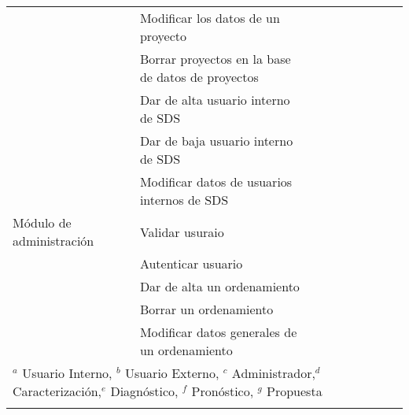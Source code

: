 \documentclass[a4paper]{report}
\begin{document}
\begin{longtable}{p{4cm} p{7cm} p{.5cm} p{.5cm} p{.5cm} p{0.8cm} p{0.8cm} p{0.8cm}p{0.8cm}}
  & Modificar los datos de un proyecto & \cellcolor{myotroazul}& &  \cellcolor{myotroazul} &&&&\\

 & Borrar proyectos en la base de datos de proyectos &\cellcolor{myotroazul} & & \cellcolor{myotroazul} &&&&\\
\hline
 & Dar de alta usuario interno de SDS & & &  \cellcolor{myotroazul} &&&&\\

 & Dar de baja usuario interno de SDS  &  & & \cellcolor{myotroazul} &&&&\\

 & Modificar datos de usuarios internos de SDS & & & \cellcolor{myotroazul} &&&&\\

Módulo de administración & Validar usuraio &  & & \cellcolor{myotroazul} &&&&\\

 & Autenticar usuario & & & \cellcolor{myotroazul} &&&&\\

 & Dar de alta un ordenamiento & & & \cellcolor{myotroazul} &&&&\\

 & Borrar un ordenamiento & & & \cellcolor{myotroazul} &&&&\\

 & Modificar datos generales de un ordenamiento & & & \cellcolor{myotroazul} &&&&\\
\hline
\multicolumn{7}{l}{\small{$^a$ Usuario Interno, $^b$ Usuario Externo, $^c$ Administrador,$^d$ Caracterización,$^e$ Diagnóstico, $^f$ Pronóstico, $^g$ Propuesta}} &&& &\\

  \\
\end{longtable}
\endgroup
\pagebreak
\restoregeometry
\end{document}
